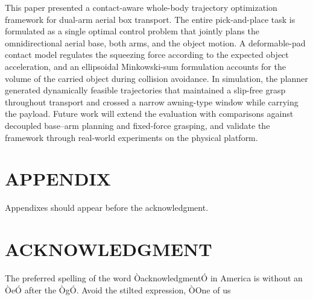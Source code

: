 \documentclass[letterpaper, 10 pt, conference]{ieeeconf}  %
\begin{document}
This paper presented a contact-aware whole-body trajectory optimization framework for dual-arm aerial box transport.
The entire pick-and-place task is formulated as a single optimal control problem that jointly plans the omnidirectional aerial base, both arms, and the object motion.
A deformable-pad contact model regulates the squeezing force according to the expected object acceleration, and an ellipsoidal Minkowski-sum formulation accounts for the volume of the carried object during collision avoidance.
In simulation, the planner generated dynamically feasible trajectories that maintained a slip-free grasp throughout transport and crossed a narrow awning-type window while carrying the payload.
Future work will extend the evaluation with comparisons against decoupled base--arm planning and fixed-force grasping, and validate the framework through real-world experiments on the physical platform.

 

\addtolength{\textheight}{-12cm}   %







\section*{APPENDIX}

Appendixes should appear before the acknowledgment.

\section*{ACKNOWLEDGMENT}

The preferred spelling of the word ÒacknowledgmentÓ in America is without an ÒeÓ after the ÒgÓ. Avoid the stilted expression, ÒOne of us 




\vfill
\end{document}
